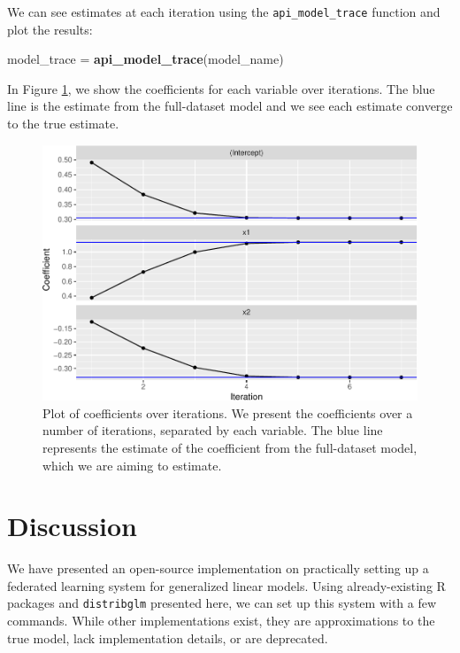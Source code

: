 \documentclass[]{elsarticle} %
\newenvironment{Shaded}{\begin{snugshade}}{\end{snugshade}}
\newcommand{\KeywordTok}[1]{\textcolor[rgb]{0.13,0.29,0.53}{\textbf{#1}}}
\newcommand{\NormalTok}[1]{#1}
\newcommand{\StringTok}[1]{\textcolor[rgb]{0.31,0.60,0.02}{#1}}
\begin{document}
We can see estimates at each iteration using the \texttt{api\_model\_trace} function and plot the results:

\begin{Shaded}
\begin{Highlighting}[]
\NormalTok{model\_trace =}\StringTok{ }\KeywordTok{api\_model\_trace}\NormalTok{(model\_name)}
\end{Highlighting}
\end{Shaded}

In Figure \ref{fig:traceplot}, we show the coefficients for each variable over iterations. The blue line is the estimate from the full-dataset model and we see each estimate converge to the true estimate.

\begin{figure}
\centering
\includegraphics{index_files/figure-latex/traceplot-1.pdf}
\caption{\label{fig:traceplot}Plot of coefficients over iterations. We present the coefficients over a number of iterations, separated by each variable. The blue line represents the estimate of the coefficient from the full-dataset model, which we are aiming to estimate.}
\end{figure}

\hypertarget{discussion}{%
\section{Discussion}\label{discussion}}

We have presented an open-source implementation on practically setting up a federated learning system for generalized linear models. Using already-existing R packages and \texttt{distribglm} presented here, we can set up this system with a few commands. While other implementations exist, they are approximations to the true model, lack implementation details, or are deprecated.
\end{document}
